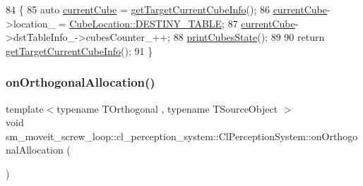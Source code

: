 \begin{DoxyCode}
84             \{
85                 \textcolor{keyword}{auto} \hyperlink{classsm__moveit__screw__loop_1_1cl__perception__system_1_1ClPerceptionSystem_a21d95597754f74b644602b8697bb07dc}{currentCube} = \hyperlink{classsm__moveit__screw__loop_1_1cl__perception__system_1_1ClPerceptionSystem_ad9231b87b9592cc5c847ce1b92a75446}{getTargetCurrentCubeInfo}();
86                 \hyperlink{classsm__moveit__screw__loop_1_1cl__perception__system_1_1ClPerceptionSystem_a21d95597754f74b644602b8697bb07dc}{currentCube}->location\_ = \hyperlink{namespacesm__moveit__screw__loop_1_1cl__perception__system_a3685ee11048648ccb59214d2341fb8caacdc3fdda18904b4a1ac0be036c86f973}{CubeLocation::DESTINY\_TABLE};
87                 \hyperlink{classsm__moveit__screw__loop_1_1cl__perception__system_1_1ClPerceptionSystem_a21d95597754f74b644602b8697bb07dc}{currentCube}->dstTableInfo\_->cubesCounter\_++;
88                 \hyperlink{classsm__moveit__screw__loop_1_1cl__perception__system_1_1ClPerceptionSystem_ae6355186bed36a732791854be792e200}{printCubesState}();
89 
90                 \textcolor{keywordflow}{return} \hyperlink{classsm__moveit__screw__loop_1_1cl__perception__system_1_1ClPerceptionSystem_ad9231b87b9592cc5c847ce1b92a75446}{getTargetCurrentCubeInfo}();
91             \}
\end{DoxyCode}
\mbox{\label{classsm__moveit__screw__loop_1_1cl__perception__system_1_1ClPerceptionSystem_aa8d51d8eb33bfb62e25e623bc7ee1ec0}} 
\subsubsection{\texorpdfstring{on\+Orthogonal\+Allocation()}{onOrthogonalAllocation()}}
{\footnotesize\ttfamily template$<$typename T\+Orthogonal , typename T\+Source\+Object $>$ \\
void sm\+\_\+moveit\+\_\+screw\+\_\+loop\+::cl\+\_\+perception\+\_\+system\+::\+Cl\+Perception\+System\+::on\+Orthogonal\+Allocation (\begin{DoxyParamCaption}{ }\end{DoxyParamCaption})\hspace{0.3cm}{\ttfamily [inline]}}




